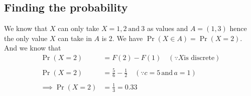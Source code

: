 \documentclass[journal,12pt,twocolumn]{IEEEtran}
\providecommand{\brak}[1]{\ensuremath{\left(#1\right)}}
\begin{document}
\subsection{Finding the probability }
 We know that $X$ can only take $X =1,2 \: \text{and}\: 3 $ as values and $A = \brak{1,3} $ hence the only value $X$ can take in $A$ is 2. We have $\Pr\brak{X\in A} = \Pr\brak{X = 2}$. And we know that  
\begin{align}
 \Pr\brak{X =2 } &= F\brak{2}-F\brak{1} \quad \brak{\because X \text{is discrete}}\\
\nonumber \\
\Pr\brak{X =2 } &= \frac{5}{6}-\frac{1}{2} \quad \brak{\because c =5 \,\text{and} \,a = 1}\\
\nonumber\\
 \implies \Pr\brak{X = 2} &= \frac{1}{3}=0.33
\end{align}
\end{document}
